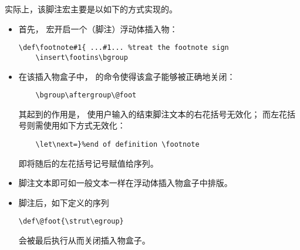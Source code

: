 \documentclass{book}
\begin{document}
实际上，该脚注宏主要是以如下的方式实现的。
\begin{itemize}\item 首先，
宏开启一个（脚注）浮动体插入物：
\begin{verbatim}
\def\footnote#1{ ...#1... %treat the footnote sign
    \insert\footins\bgroup
\end{verbatim}
\item 在该插入物盒子中，
的命令使得该盒子能够被正确地关闭：
\begin{verbatim}
    \bgroup\aftergroup\@foot
\end{verbatim}
其起到的作用是，
使用户输入的结束脚注文本的右花括号无效化；
而左花括号则需使用如下方式无效化：
\begin{verbatim}
    \let\next=}%end of definition \footnote
\end{verbatim}
即将随后的左花括号记号赋值给序列。
\item 脚注文本即可如一般文本一样在浮动体插入物盒子中排版。
\item 脚注后，如下定义的序列
\begin{verbatim}
\def\@foot{\strut\egroup}
\end{verbatim}
会被最后执行从而关闭插入物盒子。
\end{itemize}
\end{document}
